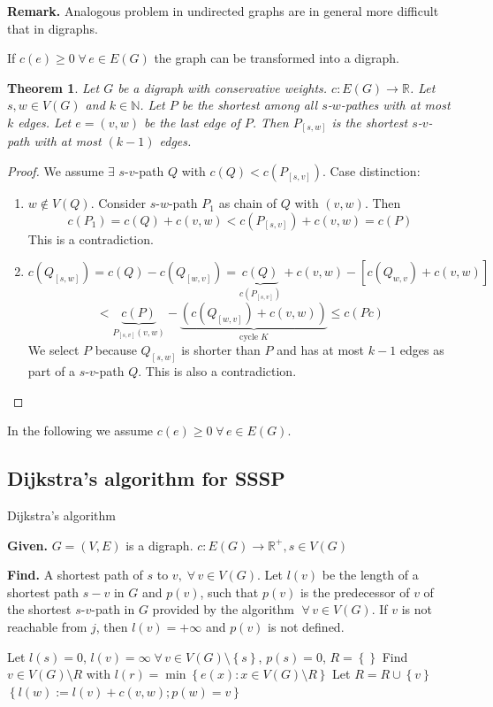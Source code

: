 \documentclass{article}
\newtheorem{theorem}{Theorem}
\newcommand{\set}[1]{\left\{#1\right\}}
\newcommand{\given}[1]{\textbf{Given.} #1\par}
\newcommand{\find}[1]{\textbf{Find.} #1\par}
\newcommand{\gath}[2]{$#1$-$#2$-path} %
\newcommand{\fall}{\;\forall\,}
\begin{document}
\textbf{Remark.}
  Analogous problem in undirected graphs are in general more difficult that in digraphs.

If $c(e) \geq 0 \fall e \in E(G)$ the graph can be transformed into a digraph.

\begin{theorem}\label{proposition-3.1}
Let $G$ be a digraph with conservative weights. $c: E(G) \rightarrow \mathbb{R}$. Let $s, w \in V(G)$ and $k \in \mathbb{N}$. Let $P$ be the shortest among all \gath swes with at most $k$ edges. Let $e = (v, w)$ be the last edge of $P$. Then $P_{[s, w]}$ is the shortest \gath sv with at most $(k-1)$ edges.
\end{theorem}

\begin{proof}
We assume $\exists$ \gath sv $Q$ with $c(Q) < c(P_{[s,v]})$. Case distinction:
\begin{enumerate}
  \item $w \notin V(Q)$. Consider \gath sw $P_1$ as chain of $Q$ with $(v, w)$. Then
    \[
      c(P_1) = c(Q) + c(v, w) < c(P_{[s,v]}) + c(v,w) = c(P)
    \]
    This is a contradiction.
  \item
    \[
      c(Q_{[s,w]}) = c(Q) - c(Q_{[w,v]})
        = \underbrace{c(Q)}_{c(P_{[s,v]})} + c(v,w) - [c(Q_{w,v}) + c(v,w)]
    \] \[
        < \underbrace{c(P)}_{P_{[s,v]}(v,w)}
          - \underbrace{\left(c(Q_{[w,v]}) + c(v,w)\right)}_{\text{cycle }K}
        \leq c(Pc)
    \]
    We select $P$ because $Q_{[s,w]}$ is shorter than $P$ and has at most $k-1$ edges as part of a \gath sv $Q$. This is also a contradiction.
\end{enumerate}
\end{proof}

In the following we assume $c(e) \geq 0 \fall e \in E(G)$.

\subsection{Dijkstra's algorithm for SSSP}
%
\begin{algorithm}
  \caption{Dijkstra's algorithm}
  \label{dijkstras-algo}
  \given{$G = (V, E)$ is a digraph. $c: E(G) \rightarrow \mathbb{R}^+, s \in V(G)$}
  \find{A shortest path of $s$ to $v, \fall v \in V(G)$. Let $l(v)$ be the length of a shortest path $s-v$ in $G$ and $p(v)$, such that $p(v)$ is the predecessor of $v$ of the shortest \gath sv in $G$ provided by the algorithm $\fall v \in V(G)$. If $v$ is not reachable from $j$, then $l(v) = +\infty$ and $p(v)$ is not defined.}
\begin{algorithmic}[1]
  \State Let $l(s) = 0$, $l(v) = \infty \fall v \in V(G) \setminus \set{s}$, $p(s) = 0$, $R = \set{}$
  \State Find $v \in V(G) \setminus R$ with $l(r) = \min\set{e(x) : x \in V(G) \setminus R}$ \label{dijkstra-redo}
  \State Let $R = R \cup \set{v}$
      \State $\set{l(w) := l(v) + c(v, w); p(w) = v}$
    \EndIf
  \EndFor
  \EndIf
\end{algorithmic}
\end{algorithm}
\end{document}

